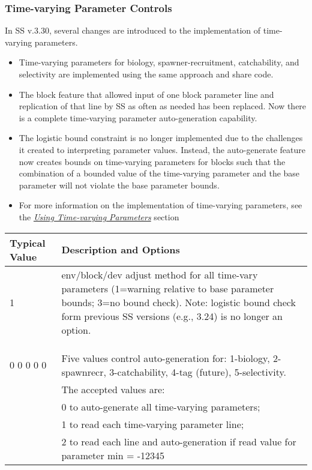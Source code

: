 \pagebreak
\subsubsection{Time-varying Parameter Controls}
In SS v.3.30, several changes are introduced to the implementation of time-varying parameters.

\begin{itemize}
  \item	Time-varying parameters for biology, spawner-recruitment, catchability, and selectivity are implemented using the same approach and share code.
  \item The block feature that allowed input of one block parameter line and replication of that line by SS as often as needed has been replaced.  Now there is a complete time-varying parameter auto-generation capability.
  \item The logistic bound constraint is no longer implemented due to the challenges it created to interpreting parameter values.  Instead, the auto-generate feature now creates bounds on time-varying parameters for blocks such that the combination of a bounded  value of the time-varying parameter and the base parameter will not violate the base parameter bounds.
  \item For more information on the implementation of time-varying parameters, see the \hyperlink{TVpara}{\textit{Using Time-varying Parameters}} section
\end{itemize}	
	
\begin{longtable}{p{0.5cm} p{2cm} p{12cm}}
     \multicolumn{2}{l}{Typical Value} & Description and Options\\
     \hline
	 1 & & \multirow{1}{6cm}[-0.1cm]{\parbox{12cm}{env/block/dev adjust method for all time-vary parameters (1=warning relative to base parameter bounds; 3=no bound check). Note: logistic bound check form previous SS versions (e.g., 3.24) is no longer an option.}}
	\\ \\ \\ \\
	\multicolumn{2}{l}{0 0 0 0 0} & Five values control auto-generation for:  1-biology, 2-spawnrecr, 3-catchability, 4-tag (future), 5-selectivity.\\
	&			& The accepted values are:\\
	&           & 0 to auto-generate all time-varying parameters;\\
	& 			& 1 to read each time-varying parameter line;\\
	&			& 2 to read each line and auto-generation if read value for parameter min = -12345 \\
	\hline
\end{longtable}


